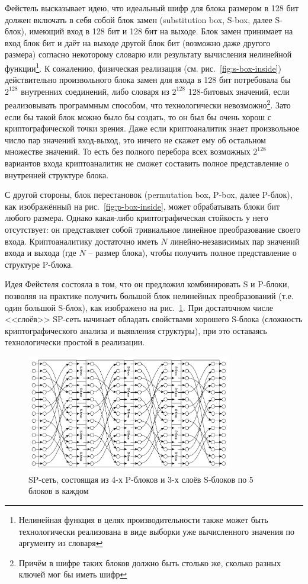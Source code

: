 Фейстель высказывает идею, что идеальный шифр для блока размером в 128 бит должен включать в себя собой блок замен (substitution box, S-box, далее S-блок), имеющий вход в 128 бит и 128 бит на выходе. Блок замен принимает на вход блок бит и даёт на выходе другой блок бит (возможно даже другого размера) согласно некоторому словарю или результату вычисления нелинейной функции\footnote{Нелинейная функция в целях производительности также может быть технологически реализована в виде выборки уже вычисленного значения по аргументу из словаря}. К сожалению, физическая реализация (см. рис.~\ref{fig:s-box-inside}) действительно произвольного блока замен для входа в 128 бит потребовала бы $2^{128}$ внутренних соединений, либо словаря из $2^{128}$ 128-битовых значений, если реализовывать программным способом, что технологически невозможно\footnote{Причём в шифре таких блоков должно быть столько же, сколько разных ключей мог бы иметь шифр}. Зато если бы такой блок можно было бы создать, то он был бы очень хорош с криптографической точки зрения. Даже если криптоаналитик знает произвольное число пар значений вход-выход, это ничего не скажет ему об остальном множестве значений. То есть без полного перебора всех возможных $2^{128}$ вариантов входа криптоаналитик не сможет составить полное представление о внутренней структуре блока.

С другой стороны, блок перестановок (permutation box, P-box, далее P-блок), как изображённый на рис.~\ref{fig:p-box-inside}, может обрабатывать блоки бит любого размера. Однако какая-либо криптографическая стойкость у него отсутствует: он представляет собой тривиальное линейное преобразование своего входа. Криптоаналитику достаточно иметь $N$ линейно-независимых пар значений входа и выхода (где $N$ -- размер блока), чтобы получить полное представление о структуре P-блока.

Идея Фейстеля состояла в том, что он предложил комбинировать S и P-блоки, позволяя на практике получить большой блок нелинейных преобразований (т.е. один большой S-блок), как изображено на рис.~\ref{fig:sp-network}. При достаточном числе <<слоёв>> SP-сеть начинает обладать свойствами хорошего S-блока (сложность криптографического анализа и выявления структуры), при это оставаясь технологически простой в реализации.

\begin{figure}[htb]
	\centering
	\includegraphics[width=0.8\textwidth]{pic/sp-network}
  \caption{SP-сеть, состоящая из 4-х P-блоков и 3-х слоёв S-блоков по 5 блоков в каждом}
  \label{fig:sp-network}
\end{figure}


